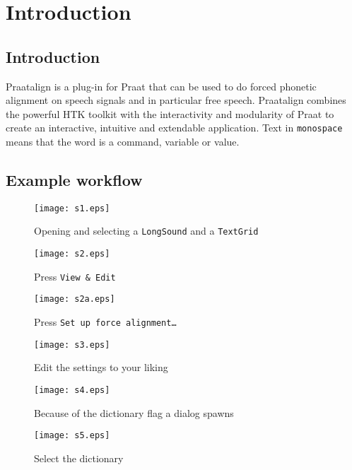 
\cleardoublepage
\maketitle
\setcounter{page}{1}
\tableofcontents
\chapter{Introduction}
\section{Introduction}
Praatalign is a plug-in for Praat that can be used to do forced phonetic
alignment on speech signals and in particular free speech. Praatalign combines
the powerful HTK toolkit with the interactivity and modularity of Praat to
create an interactive, intuitive and extendable application. Text in
\texttt{monospace} means that the word is a command, variable or value.

\section{Example workflow}
\begin{figure}[H]
	\centering
	\texttt{[image: s1.eps]}
	\caption{Opening and selecting a \texttt{LongSound} and a \texttt{TextGrid}}
\end{figure}

\begin{figure}[H]
	\centering
	\texttt{[image: s2.eps]}
	\caption{Press \texttt{View \& Edit}}
\end{figure}

\begin{figure}[H]
	\centering
	\texttt{[image: s2a.eps]}
	\caption{Press \texttt{Set up force alignment\ldots}}
\end{figure}

\begin{figure}[H]
	\centering
	\texttt{[image: s3.eps]}
	\caption{Edit the settings to your liking}
\end{figure}

\begin{figure}[H]
	\centering
	\texttt{[image: s4.eps]}
	\caption{Because of the dictionary flag a dialog spawns}
\end{figure}

\begin{figure}[H]
	\centering
	\texttt{[image: s5.eps]}
	\caption{Select the dictionary}
\end{figure}

